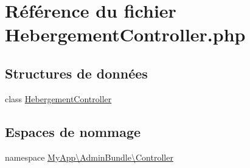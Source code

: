 \hypertarget{_hebergement_controller_8php}{\section{Référence du fichier Hebergement\-Controller.\-php}
\label{_hebergement_controller_8php}
}
\subsection*{Structures de données}
\begin{DoxyCompactItemize}
\item 
class \hyperlink{class_my_app_1_1_admin_bundle_1_1_controller_1_1_hebergement_controller}{Hebergement\-Controller}
\end{DoxyCompactItemize}
\subsection*{Espaces de nommage}
\begin{DoxyCompactItemize}
\item 
namespace \hyperlink{namespace_my_app_1_1_admin_bundle_1_1_controller}{My\-App\textbackslash{}\-Admin\-Bundle\textbackslash{}\-Controller}
\end{DoxyCompactItemize}
